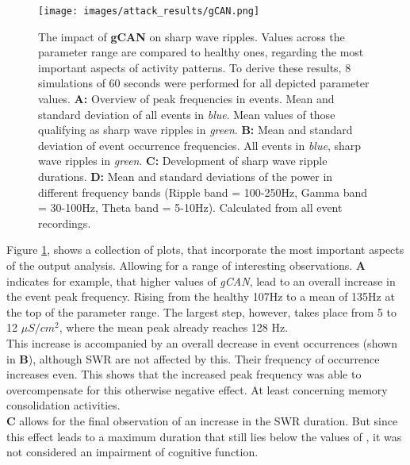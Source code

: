        \begin{figure}[htbp]
            \centering
            \texttt{[image: images/attack\_results/gCAN.png]}
            \caption{The impact of \textbf{gCAN} on sharp wave ripples. Values across the parameter range are compared to healthy ones, regarding the most important aspects of activity patterns. To derive these results, 8 simulations of 60 seconds were performed for all depicted parameter values. \textbf{A:} Overview of peak frequencies in events. Mean and standard deviation of all events in \textit{blue}. Mean values of those qualifying as sharp wave ripples in \textit{green}. \textbf{B:} Mean and standard deviation of event occurrence frequencies. All events in \textit{blue}, sharp wave ripples in \textit{green}. \textbf{C:} Development of sharp wave ripple durations. \textbf{D:} Mean and standard deviations of the power in different frequency bands (Ripple band = 100-250Hz, Gamma band = 30-100Hz, Theta band = 5-10Hz). Calculated from all event recordings.}
            \label{fig:attack-gCAN}
        \end{figure}
        Figure \ref{fig:attack-gCAN}, shows a collection of plots, that incorporate the most important aspects of the output analysis. Allowing for a range of interesting observations. \textbf{A} indicates for example, that higher values of \textit{gCAN}, lead to an overall increase in the event peak frequency. Rising from the healthy 107Hz to a mean of 135Hz at the top of the parameter range. The largest step, however, takes place from 5 to 12 \(\mu S/cm^2\), where the mean peak already reaches 128 Hz.\\
        This increase is accompanied by an overall decrease in event occurrences (shown in \textbf{B}), although SWR are not affected by this. Their frequency of occurrence increases even. This shows that the increased peak frequency was able to overcompensate for this otherwise negative effect. At least concerning memory consolidation activities.\\
        \textbf{C} allows for the final observation of an increase in the SWR duration. But since this effect leads to a maximum duration that still lies below the values of \textcite{AmelieAussel.2020}, it was not considered an impairment of cognitive function.\\


